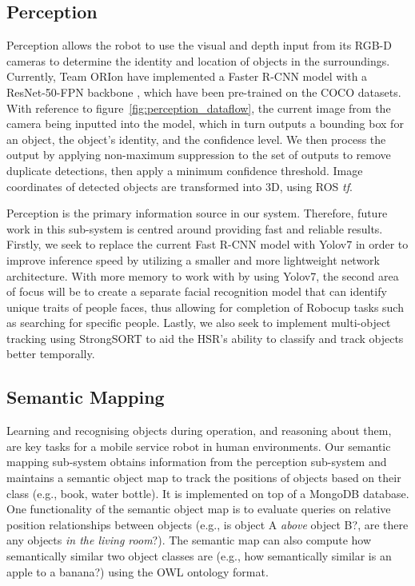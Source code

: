 \documentclass[runningheads,a4paper]{llncs}
\newcommand{\teamori}{Team ORIon}
\begin{document}
\subsection{Perception}\label{sec:capability-perception}


Perception allows the robot to use the visual and depth input from its RGB-D cameras to determine the identity and location of objects in the surroundings. Currently, \teamori{} have implemented a Faster R-CNN model with a ResNet-50-FPN backbone \cite{ren2015faster}, which have been pre-trained on the COCO datasets. With reference to figure~\ref{fig:perception_dataflow}, the current image from the camera being inputted into the model, which in turn outputs a bounding box for an object, the object's identity, and the confidence level. We then process the output by applying non-maximum suppression to the set of outputs to remove duplicate detections, then apply a minimum confidence threshold. Image coordinates of detected objects are transformed into 3D, using ROS \textit{tf}.  

Perception is the primary information source in our system. Therefore, future work in this sub-system is centred around providing fast and reliable results. Firstly, we seek to replace the current Fast R-CNN model with Yolov7 \cite{yolov7} in order to improve inference speed by utilizing a smaller and more lightweight network architecture. With more memory to work with by using Yolov7, the second area of focus will be to create a separate facial recognition model that can identify unique traits of people faces, thus allowing for completion of Robocup tasks such as searching for specific people. Lastly, we also seek to implement multi-object tracking using StrongSORT \cite{strongsort} to aid the HSR's ability to classify and track objects better temporally. 


\subsection{Semantic Mapping}

Learning and recognising objects during operation, and reasoning about them, are key tasks for a mobile service robot in human environments. Our semantic mapping sub-system obtains information from the perception sub-system and maintains a semantic object map to track the positions of objects based on their class (e.g., book, water bottle). It is implemented on top of a MongoDB database. One functionality of the semantic object map is to evaluate queries on relative position relationships between objects (e.g., is object A \emph{above} object B?, are there any objects \emph{in the living room}?). The semantic map can also compute how semantically similar two object classes are (e.g., how semantically similar is an apple to a banana?) using the OWL ontology format. 
\end{document}
